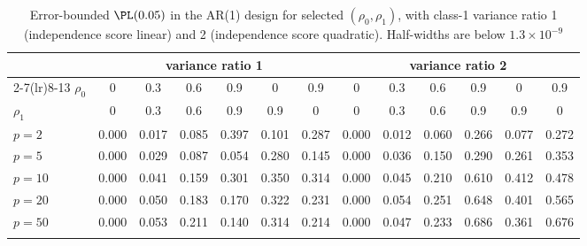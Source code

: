 \begin{table}[t]
\caption{Error-bounded $\PL(0.05)$ in the AR(1) design for selected $(\rho_0,\rho_1)$, with class-1 variance ratio 1 (independence score linear) and 2 (independence score quadratic). Half-widths are below $1.3\times10^{-9}$}\label{tab:ar1}
\footnotesize\setlength{\tabcolsep}{3pt}
\begin{tabular*}{\textwidth}{@{\extracolsep\fill}lcccccccccccc@{}}
\toprule
 & \multicolumn{6}{c}{variance ratio 1} & \multicolumn{6}{c}{variance ratio 2}\\
\cmidrule(lr){2-7}\cmidrule(lr){8-13}
$\rho_0$ & 0 & 0.3 & 0.6 & 0.9 & 0 & 0.9 & 0 & 0.3 & 0.6 & 0.9 & 0 & 0.9\\
$\rho_1$ & 0 & 0.3 & 0.6 & 0.9 & 0.9 & 0 & 0 & 0.3 & 0.6 & 0.9 & 0.9 & 0\\
\midrule
$p=2$ & 0.000 & 0.017 & 0.085 & 0.397 & 0.101 & 0.287 & 0.000 & 0.012 & 0.060 & 0.266 & 0.077 & 0.272\\
$p=5$ & 0.000 & 0.029 & 0.087 & 0.054 & 0.280 & 0.145 & 0.000 & 0.036 & 0.150 & 0.290 & 0.261 & 0.353\\
$p=10$ & 0.000 & 0.041 & 0.159 & 0.301 & 0.350 & 0.314 & 0.000 & 0.045 & 0.210 & 0.610 & 0.412 & 0.478\\
$p=20$ & 0.000 & 0.050 & 0.183 & 0.170 & 0.322 & 0.231 & 0.000 & 0.054 & 0.251 & 0.648 & 0.401 & 0.565\\
$p=50$ & 0.000 & 0.053 & 0.211 & 0.140 & 0.314 & 0.214 & 0.000 & 0.047 & 0.233 & 0.686 & 0.361 & 0.676\\
\botrule
\end{tabular*}
\end{table}
